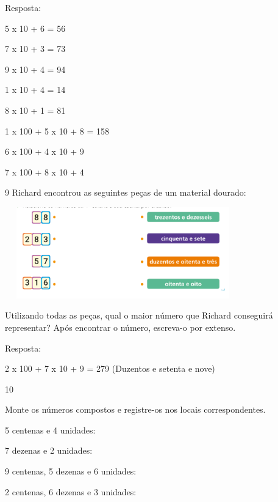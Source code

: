 Resposta:

\begin{escolha}

\item
  5 x 10 + 6 = 56
\item
  7 x 10 + 3 = 73
\item
  9 x 10 + 4 = 94
\item
  1 x 10 + 4 = 14
\item
  8 x 10 + 1 = 81
\item
  1 x 100 + 5 x 10 + 8 = 158
\item
  6 x 100 + 4 x 10 + 9
\item
  7 x 100 + 8 x 10 + 4
\end{escolha}

\num{9} Richard encontrou as seguintes peças de um material dourado:


\includegraphics[width=4.02535in,height=1.55013in]{media/image5.png}

Utilizando todas as peças, qual o maior número que Richard conseguirá
representar? Após encontrar o número, escreva-o por extenso.


Resposta:

2 x 100 + 7 x 10 + 9 = 279 (Duzentos e setenta e nove)

\num{10}

Monte os números compostos e registre-os nos locais correspondentes.

\begin{escolha}

  \item 5 centenas e 4 unidades:

  \item 7 dezenas e 2 unidades:

  \item 9 centenas, 5 dezenas e 6 unidades:

  \item 2 centenas, 6 dezenas e 3 unidades:

\end{escolha}

